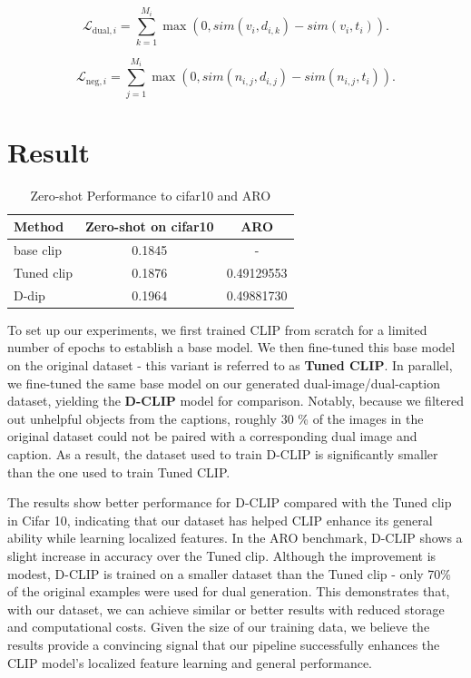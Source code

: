 \documentclass[11pt,letterpaper]{article}
\begin{document}
\begin{equation}
\mathcal{L}_{\text{dual},i} = \sum_{k=1}^{M_i} \max\left(0, sim(v_i, d_{i,k}) - sim(v_i, t_i)\right).
\end{equation}

\begin{equation}
\mathcal{L}_{\text{neg},i} = \sum_{j=1}^{M_i} \max\left(0, sim(n_{i,j}, d_{i,j}) - sim(n_{i,j}, t_i)\right).
\end{equation}

\FloatBarrier 








\section{Result}
\begin{table}[ht]
\centering
\caption{Zero-shot Performance to cifar10 and ARO}
\begin{tabular}{|l|c|c|}
\hline
\textbf{Method} & \textbf{Zero-shot on cifar10} & \textbf{ARO} \\ \hline
base clip       & 0.1845              & -            \\ \hline
Tuned clip & 0.1876              & 0.49129553       \\ \hline
D-dip           & 0.1964              & 0.49881730       \\ \hline
\end{tabular}
\end{table}

To set up our experiments, we first trained CLIP from scratch for a limited number of epochs to establish a base model. We then fine-tuned this base model on the original dataset - this variant is referred to as \textbf{Tuned CLIP}. In parallel, we fine-tuned the same base model on our generated dual-image/dual-caption dataset, yielding the \textbf{D-CLIP} model for comparison. Notably, because we filtered out unhelpful objects from the captions, roughly 30 \% of the images in the original dataset could not be paired with a corresponding dual image and caption. As a result, the dataset used to train D-CLIP is significantly smaller than the one used to train Tuned CLIP.

The results show better performance for D-CLIP compared with the Tuned clip in Cifar 10, indicating that our dataset has helped CLIP enhance its general ability while learning localized features. In the ARO benchmark, D-CLIP shows a slight increase in accuracy over the Tuned clip. Although the improvement is modest, D-CLIP is trained on a smaller dataset than the Tuned clip - only 70\% of the original examples were used for dual generation. This demonstrates that, with our dataset, we can achieve similar or better results with reduced storage and computational costs. Given the size of our training data, we believe the results provide a convincing signal that our pipeline successfully enhances the CLIP model’s localized feature learning and general performance.
\end{document}
